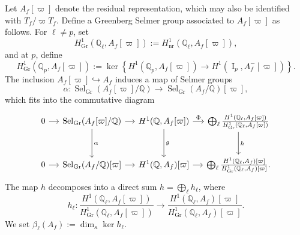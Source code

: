 \documentclass[table]{amsart}
\newcommand{\Q}{\mathbb{Q}}
\newcommand{\op}[1]{\operatorname{#1}}
\numberwithin{equation}{section}
\begin{document}
Let $A_f[\varpi]$ denote the residual representation, which may also be identified with $T_f / \varpi T_f$. Define a Greenberg Selmer group associated to $A_f[\varpi]$ as follows. For $\ell \neq p$, set  
\[
H^1_{\operatorname{Gr}}(\Q_\ell, A_f[\varpi]) := H^1_{\operatorname{nr}}(\Q_\ell, A_f[\varpi]),
\]
and at $p$, define  
\[
H^1_{\operatorname{Gr}}(\Q_p, A_f[\varpi]) := \ker\left\{ H^1(\Q_p, A_f[\varpi]) \longrightarrow H^1(\operatorname{I}_p, A_f^-[\varpi]) \right\}.
\]
The inclusion $A_f[\varpi] \hookrightarrow A_f$ induces a map of Selmer groups  
\[
\alpha \colon \operatorname{Sel}_{\operatorname{Gr}}(A_f[\varpi]/\Q) \longrightarrow \operatorname{Sel}_{\operatorname{Gr}}(A_f/\Q)[\varpi],
\]
which fits into the commutative diagram  
\begin{equation}\label{BK exact diagram}
\begin{tikzcd}[column sep = small, row sep = large]
0 \arrow{r} & \operatorname{Sel}_{\operatorname{Gr}}(A_f[\varpi]/\Q) \arrow{r} \arrow{d}{\alpha} & H^1(\Q, A_f[\varpi]) \arrow{r}{\Phi} \arrow{d}{g} & \bigoplus_{\ell} \frac{H^1(\Q_\ell, A_f[\varpi])}{H^1_{\operatorname{Gr}}(\Q_\ell, A_f[\varpi])} \arrow{d}{h} \\
0 \arrow{r} & \operatorname{Sel}_{\operatorname{Gr}}(A_f/\Q)[\varpi] \arrow{r} & H^1(\Q, A_f)[\varpi] \arrow{r} & \bigoplus_{\ell} \frac{H^1(\Q_\ell, A_f)[\varpi]}{H^1_{\operatorname{Gr}}(\Q_\ell, A_f)[\varpi]}.
\end{tikzcd}
\end{equation}
\noindent The map $h$ decomposes into a direct sum $h=\bigoplus_\ell h_\ell$, where
\[h_\ell:\frac{H^1(\Q_\ell, A_f[\varpi])}{H^1_{\operatorname{Gr}}(\Q_\ell, A_f[\varpi])}\longrightarrow \frac{H^1(\Q_\ell, A_f)[\varpi]}{H^1_{\operatorname{Gr}}(\Q_\ell, A_f)[\varpi]}.\]
We set $\beta_\ell(A_f):=\dim_{\kappa}\op{ker}h_\ell$.
\end{document}
